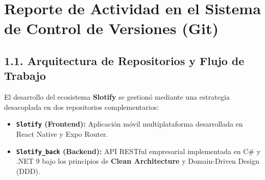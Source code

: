 \documentclass[11pt,letterpaper]{article}
\begin{document}
\newpage
\setcounter{page}{1}

\section{Reporte de Actividad en el Sistema de Control de Versiones (Git)}

\subsection{1.1. Arquitectura de Repositorios y Flujo de Trabajo}
El desarrollo del ecosistema \textbf{Slotify} se gestionó mediante una estrategia desacoplada en dos repositorios complementarios:
\begin{itemize}[leftmargin=0.8cm]
    \item \textbf{\texttt{Slotify} (Frontend):} Aplicación móvil multiplataforma desarrollada en React Native y Expo Router.
    \item \textbf{\texttt{Slotify\_back} (Backend):} API RESTful empresarial implementada en C\# y .NET 9 bajo los principios de \textbf{Clean Architecture} y Domain-Driven Design (DDD).
\end{itemize}
\end{document}

